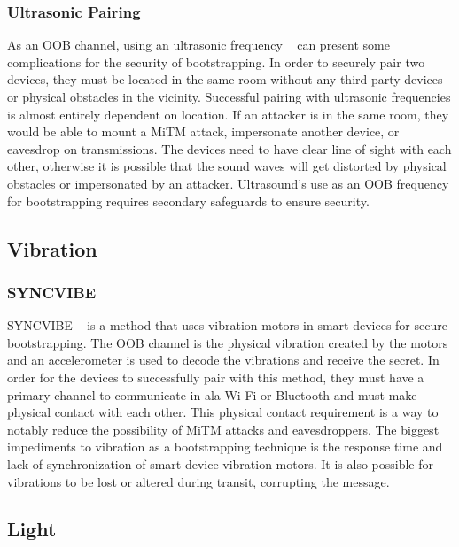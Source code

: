 \subsubsection{Ultrasonic Pairing}
As an OOB channel, using an ultrasonic frequency ~\cite{mayrhofer2007security} can present some complications for the security of bootstrapping. In order to securely pair two devices, they must be located in the same room without any third-party devices or physical obstacles in the vicinity. Successful pairing with ultrasonic frequencies is almost entirely dependent on location. If an attacker is in the same room, they would be able to mount a MiTM attack, impersonate another device, or eavesdrop on transmissions. The devices need to have clear line of sight with each other, otherwise it is possible that the sound waves will get distorted by physical obstacles or impersonated by an attacker. Ultrasound’s use as an OOB frequency for bootstrapping requires secondary safeguards to ensure security.


\subsection{Vibration}
\subsubsection{SYNCVIBE}
SYNCVIBE ~\cite{lee2018syncvibe} is a method that uses vibration motors in smart devices for secure bootstrapping. The OOB channel is the physical vibration created by the motors and an accelerometer is used to decode the vibrations and receive the secret. In order for the devices to successfully pair with this method, they must have a primary channel to communicate in ala Wi-Fi or Bluetooth and must make physical contact with each other. This physical contact requirement is a way to notably reduce the possibility of MiTM attacks and eavesdroppers. The biggest impediments to vibration as a bootstrapping technique is the response time and lack of synchronization of smart device vibration motors. It is also possible for vibrations to be lost or altered during transit, corrupting the message.


\subsection{Light}
